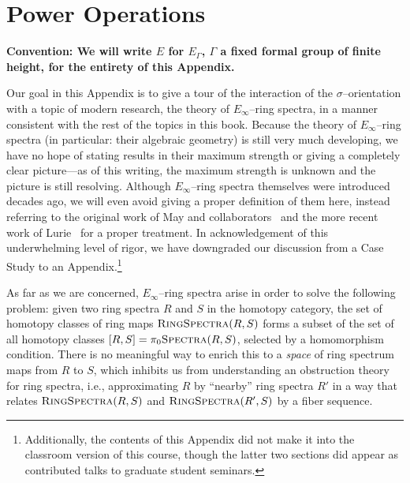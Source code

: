 


\chapter{Power Operations}\label{PowerOpnsChapter}

\begin{center}
\textbf{Convention: We will write \(E\) for \(E_\Gamma\), \(\Gamma\) a fixed formal group of finite height, for the entirety of this Appendix.}
\end{center}

Our goal in this Appendix is to give a tour of the interaction of the \(\sigma\)--orientation with a topic of modern research, the theory of \(E_\infty\)--ring spectra, in a manner consistent with the rest of the topics in this book.  Because the theory of \(E_\infty\)--ring spectra (in particular: their algebraic geometry) is still very much developing, we have no hope of stating results in their maximum strength or giving a completely clear picture---as of this writing, the maximum strength is unknown and the picture is still resolving.  Although \(E_\infty\)--ring spectra themselves were introduced decades ago, we will even avoid giving a proper definition of them here, instead referring to the original work of May and collaborators~\cite{EKMM} and the more recent work of Lurie~\cite[Chapter 7]{LurieHA} for a proper treatment.  In acknowledgement of this underwhelming level of rigor, we have downgraded our discussion from a Case Study to an Appendix.\footnote{Additionally, the contents of this Appendix did not make it into the classroom version of this course, though the latter two sections did appear as contributed talks to graduate student seminars.}

As far as we are concerned, \(E_\infty\)--ring spectra arise in order to solve the following problem: given two ring spectra \(R\) and \(S\) in the homotopy category, the set of homotopy classes of ring maps \(\normalfont\textsc{RingSpectra}(R, S)\) forms a subset of the set of all homotopy classes \([R, S] = \pi_0 \normalfont\textsc{Spectra}(R, S)\), selected by a homomorphism condition.  There is no meaningful way to enrich this to a \emph{space} of ring spectrum maps from \(R\) to \(S\), which inhibits us from understanding an obstruction theory for ring spectra, i.e., approximating \(R\) by ``nearby'' ring spectra \(R'\) in a way that relates \(\normalfont\textsc{RingSpectra}(R, S)\) and \(\normalfont\textsc{RingSpectra}(R', S)\) by a fiber sequence.

